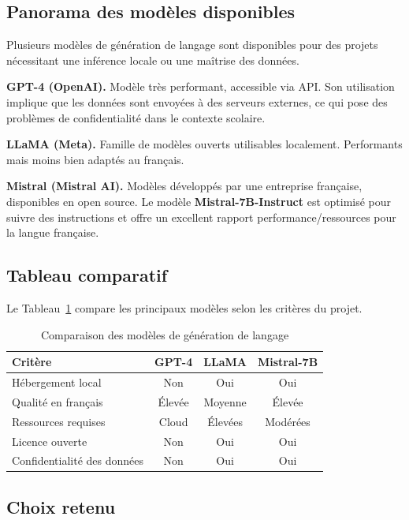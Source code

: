 \subsection{Panorama des modèles disponibles}

Plusieurs modèles de génération de langage sont disponibles pour des projets
nécessitant une inférence locale ou une maîtrise des données.

\textbf{GPT-4 (OpenAI).}
Modèle très performant, accessible via API.
Son utilisation implique que les données sont envoyées à des serveurs externes,
ce qui pose des problèmes de confidentialité dans le contexte scolaire.

\textbf{LLaMA (Meta).}
Famille de modèles ouverts utilisables localement.
Performants mais moins bien adaptés au français.

\textbf{Mistral (Mistral AI).}
Modèles développés par une entreprise française, disponibles en open source.
Le modèle \textbf{Mistral-7B-Instruct} \cite{mistral2023} est optimisé
pour suivre des instructions et offre un excellent rapport performance/ressources
pour la langue française.

\subsection{Tableau comparatif}

Le Tableau~\ref{tab:comparatif_llm} compare les principaux modèles
selon les critères du projet.

\vspace{6pt}
\begin{table}[H]
\centering
\caption{Comparaison des modèles de génération de langage}
\label{tab:comparatif_llm}
\begin{tabular}{|l|c|c|c|}
\hline
\textbf{Critère} & \textbf{GPT-4} & \textbf{LLaMA} & \textbf{Mistral-7B} \\
\hline
Hébergement local & Non & Oui & Oui \\
Qualité en français & Élevée & Moyenne & Élevée \\
Ressources requises & Cloud & Élevées & Modérées \\
Licence ouverte & Non & Oui & Oui \\
Confidentialité des données & Non & Oui & Oui \\
\hline
\end{tabular}
\end{table}

\subsection{Choix retenu}

